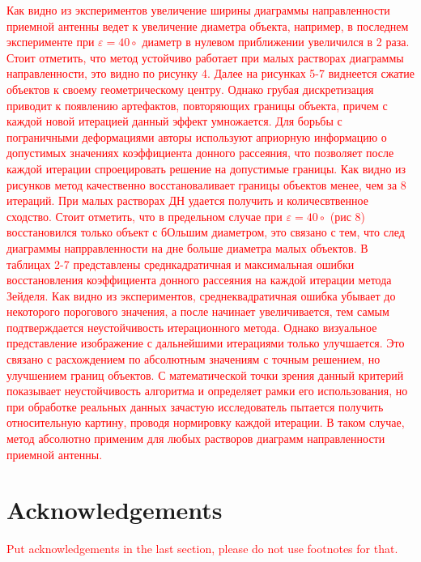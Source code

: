 \documentclass{procDDs}
\begin{document}
\textcolor{red}{Как видно из экспериментов увеличение ширины диаграммы направленности приемной антенны ведет к увеличение диаметра объекта, например, в последнем эксперименте при $\varepsilon = 40\circ $ диаметр в нулевом приближении увеличился в 2 раза.  Стоит отметить, что метод устойчиво работает при малых растворах диаграммы направленности, это видно по рисунку 4. Далее на рисунках 5-7 виднеется сжатие объектов к своему геометрическому центру. Однако грубая дискретизация приводит к появлению артефактов, повторяющих границы объекта, причем с каждой новой итерацией данный эффект умножается. Для борьбы с пограничными деформациями авторы используют априорную информацию о допустимых значениях коэффициента донного рассеяния, что позволяет после каждой итерации спроецировать решение на допустимые границы.  Как видно из рисунков метод качественно восстановаливает границы объектов менее, чем за 8 итераций. При малых растворах ДН удается получить и количесвтвенное сходство. Стоит отметить, что в предельном случае при $\varepsilon = 40\circ $ (рис 8) восстановился только объект с бОльшим диаметром, это связано с тем, что след диаграммы напрравленности на дне больше диаметра малых объектов.  В таблицах 2-7 представлены среднкадратичная и максимальная ошибки восстановления коэффициента донного рассеяния на каждой итерации метода Зейделя.  Как видно из экспериментов, среднеквадратичная ошибка убывает до некоторого порогового значения, а после начинает увеличивается, тем самым подтверждается неустойчивость итерационного метода. Однако визуальное представление изображение с дальнейшими итерациями только  улучшается. Это связано с расхождением по абсолютным значениям с точным решением, но улучшением границ объектов. С математической точки зрения данный критерий показывает неустойчивость алгоритма и определяет рамки его использования, но при обработке реальных данных зачастую исследователь пытается получить относительную картину, проводя нормировку каждой итерации. В таком случае, метод абсолютно применим для любых растворов диаграмм направленности приемной антенны.}

\section*{Acknowledgements}

\textcolor{red}{Put acknowledgements in the last section, please do not use footnotes for that.}

\end{document}
